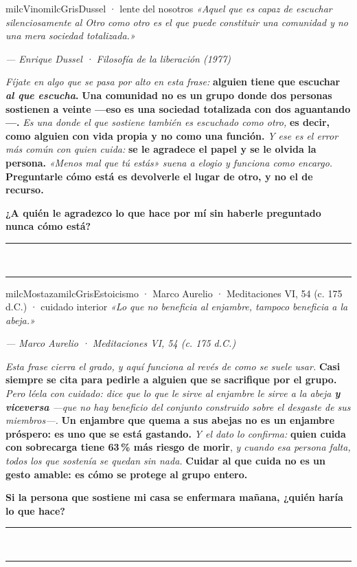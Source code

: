 \documentclass[11pt,letterpaper]{article}
\newcommand{\linead}[1]{\noindent\color{milcLinea}\rule{#1}{0.5pt}\color{milcNegro}}
\begin{document}
\begin{softbox}{milcVino}{milcGris}{Dussel · lente del nosotros}
\textit{«Aquel que es capaz de escuchar silenciosamente al Otro como otro es el que puede constituir una comunidad y no una mera sociedad totalizada.»}

{\footnotesize\itshape\color{milcNegro!70}--- Enrique Dussel · Filosofía de la liberación (1977)}

\emph{Fíjate en algo que se pasa por alto en esta frase:} \textbf{alguien tiene que escuchar \emph{al que escucha}.} \textbf{Una comunidad no es un grupo donde dos personas sostienen a veinte ---eso es una sociedad totalizada con dos aguantando---.} \emph{Es una donde el que sostiene también es escuchado como otro,} \textbf{es decir, como alguien con vida propia y no como una función.} \emph{Y ese es el error más común con quien cuida:} \textbf{se le agradece el papel y se le olvida la persona.} \emph{«Menos mal que tú estás» suena a elogio y funciona como encargo.} \textbf{Preguntarle cómo está es devolverle el lugar de otro, y no el de recurso.}

\textbf{¿A quién le agradezco lo que hace por mí sin haberle preguntado nunca cómo está?}
\end{softbox}
\linead{\linewidth}\\[1mm]
\linead{\linewidth}

\begin{softbox}{milcMostaza}{milcGris}{Estoicismo · Marco Aurelio · Meditaciones VI, 54 (c. 175 d.C.) · cuidado interior}
\textit{«Lo que no beneficia al enjambre, tampoco beneficia a la abeja.»}

{\footnotesize\itshape\color{milcNegro!70}--- Marco Aurelio · Meditaciones VI, 54 (c. 175 d.C.)}

\emph{Esta frase cierra el grado, y aquí funciona al revés de como se suele usar.} \textbf{Casi siempre se cita para pedirle a alguien que se sacrifique por el grupo.} \emph{Pero léela con cuidado: dice que lo que le sirve al enjambre le sirve a la abeja \textbf{y viceversa} ---que no hay beneficio del conjunto construido sobre el desgaste de sus miembros---.} \textbf{Un enjambre que quema a sus abejas no es un enjambre próspero: es uno que se está gastando.} \emph{Y el dato lo confirma:} \textbf{quien cuida con sobrecarga tiene 63\,\% más riesgo de morir}, \emph{y cuando esa persona falta, todos los que sostenía se quedan sin nada.} \textbf{Cuidar al que cuida no es un gesto amable: es cómo se protege al grupo entero.}

\textbf{Si la persona que sostiene mi casa se enfermara mañana, ¿quién haría lo que hace?}
\end{softbox}
\linead{\linewidth}\\[1mm]
\linead{\linewidth}
\end{document}
